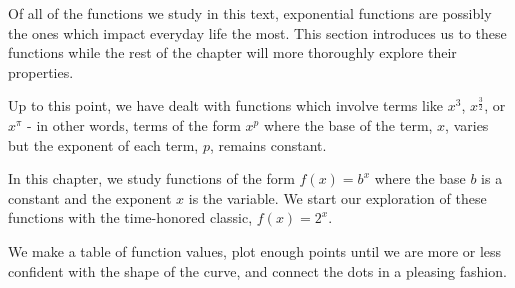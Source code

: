\documentclass{ximera}
\begin{document}
	\author{Stitz-Zeager}




\setcounter{footnote}{0}

\label{ExponentialFunctions}

Of all of the functions we study in this text, exponential  functions are possibly the ones which impact everyday life the most. This section introduces us to these functions while the rest of the chapter will more thoroughly explore their properties. 

\smallskip

 Up to this point, we have dealt with functions which involve terms like $x^3$,  $x^{\frac{3}{2}}$, or $x^{\pi}$ -  in other words, terms of the form  $x^{p}$ where the base of the term, $x$, varies but the exponent of each term, $p$, remains constant.  
 
 \smallskip
 
 In this chapter, we study functions of the form $f(x) = b^{x}$ where the base $b$ is a constant and the exponent $x$ is the variable.  We start our exploration of these functions with the time-honored classic,  $f(x) = 2^{x}$.  
 
 \smallskip
 
 We make a table of function values, plot enough points  until we are more or less confident with the shape of the curve,  and connect the dots in a pleasing fashion.
\end{document}
